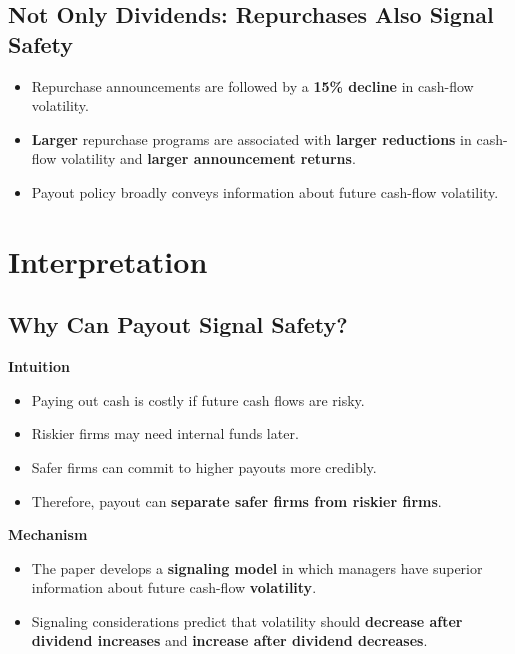 \subsection{Not Only Dividends: Repurchases Also Signal Safety}
\begin{itemize}
  \item Repurchase announcements are followed by a \textbf{15\% decline} in cash-flow volatility.
  \item \textbf{Larger} repurchase programs are associated with \textbf{larger reductions} in cash-flow volatility and \textbf{larger announcement returns}.
  \item Payout policy broadly conveys information about future cash-flow volatility.
\end{itemize}

\section{Interpretation}

\subsection{Why Can Payout Signal Safety?}

\textbf{Intuition}
\begin{itemize}
  \item Paying out cash is costly if future cash flows are risky.
  \item Riskier firms may need internal funds later.
  \item Safer firms can commit to higher payouts more credibly.
  \item Therefore, payout can \textbf{separate safer firms from riskier firms}.
\end{itemize}
\textbf{Mechanism}
\begin{itemize}
  \item The paper develops a \textbf{signaling model} in which managers have superior information about future cash-flow \textbf{volatility}.
  \item Signaling considerations predict that volatility should \textbf{decrease after dividend increases} and \textbf{increase after dividend decreases}.
\end{itemize}

